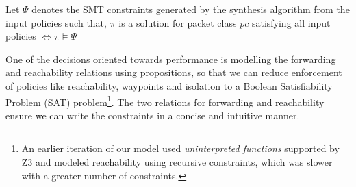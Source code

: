 \begin{mydef}
	Let $\Psi$ denotes the SMT constraints generated by the synthesis algorithm from the input policies such that,
	$\pi$ is a solution for packet class $pc$ satisfying all input policies $\Leftrightarrow \pi \models \Psi$ 
\end{mydef}

One of the decisions oriented towards performance is modelling the forwarding and reachability relations using propositions, so that we can reduce enforcement of policies like reachability, waypoints and isolation to a Boolean Satisfiability Problem (SAT) problem\footnote{An earlier iteration of our model used \emph{uninterpreted functions} supported by Z3 and modeled reachability using recursive constraints, 
	which was slower with a greater number of constraints.}. 
The two relations for forwarding and reachability ensure we can write the constraints in a concise and intuitive manner.

